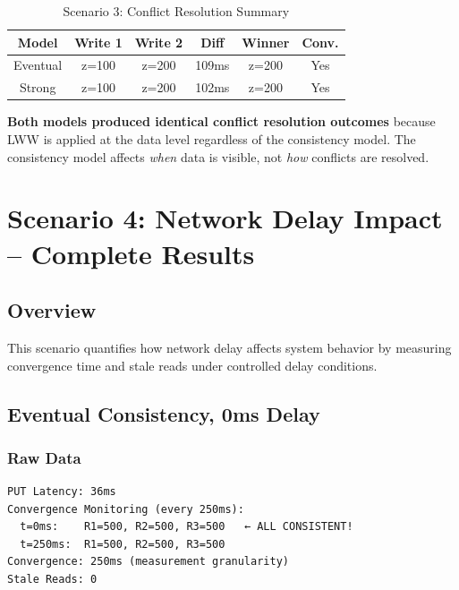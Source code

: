 \documentclass[10pt,a4paper]{article}
\begin{document}
\begin{table}[H]
\centering
\caption{Scenario 3: Conflict Resolution Summary}
\begin{tabular}{|c|c|c|c|c|c|}
\hline
\textbf{Model} & \textbf{Write 1} & \textbf{Write 2} & \textbf{Diff} & \textbf{Winner} & \textbf{Conv.} \\
\hline
Eventual & z=100 & z=200 & 109ms & z=200 & Yes \\
Strong & z=100 & z=200 & 102ms & z=200 & Yes \\
\hline
\end{tabular}
\end{table}

\textbf{Both models produced identical conflict resolution outcomes} because LWW is applied at the data level regardless of the consistency model. The consistency model affects \textit{when} data is visible, not \textit{how} conflicts are resolved.

\newpage

\section{Scenario 4: Network Delay Impact -- Complete Results}

\subsection{Overview}

This scenario quantifies how network delay affects system behavior by measuring convergence time and stale reads under controlled delay conditions.

\subsection{Eventual Consistency, 0ms Delay}

\subsubsection{Raw Data}
\begin{verbatim}
PUT Latency: 36ms
Convergence Monitoring (every 250ms):
  t=0ms:    R1=500, R2=500, R3=500   ← ALL CONSISTENT!
  t=250ms:  R1=500, R2=500, R3=500
Convergence: 250ms (measurement granularity)
Stale Reads: 0
\end{verbatim}
\end{document}
